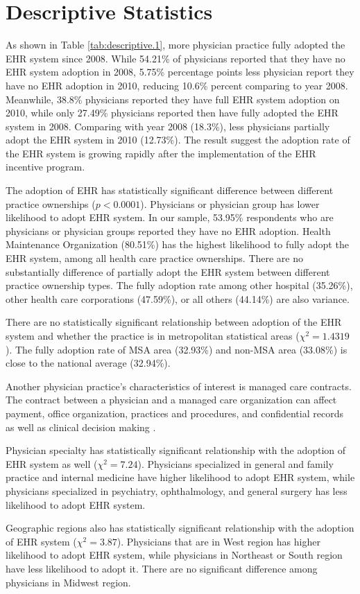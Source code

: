 \section{Descriptive Statistics}

As shown in Table \ref{tab:descriptive.1}, more physician practice fully adopted the EHR system since 2008. While 54.21\% of physicians reported that they have no EHR system adoption in 2008, 5.75\% percentage points less physician report they have no EHR adoption in 2010, reducing 10.6\% percent comparing to year 2008. Meanwhile, 38.8\% physicians reported they have full EHR system adoption on 2010, while only 27.49\% physicians reported then have fully adopted the EHR system in 2008. Comparing with year 2008 (18.3\%), less physicians partially adopt the EHR system in 2010 (12.73\%). The result suggest the adoption rate of the EHR system is growing rapidly after the implementation of the EHR incentive program.

The adoption of EHR has statistically significant difference between different practice ownerships ($p<0.0001$). Physicians or physician group has lower likelihood to adopt EHR system. In our sample, 53.95\% respondents who are physicians or physician groups reported they have no EHR adoption. Health Maintenance Organization (80.51\%) has the highest likelihood to fully adopt the EHR system, among all health care practice ownerships. There are no substantially difference of partially adopt the EHR system between different practice ownership types. The fully adoption rate among other hospital (35.26\%), other health care corporations (47.59\%), or all others (44.14\%) are also variance. 

There are no statistically significant relationship between adoption of the EHR system and whether the practice is in metropolitan statistical areas ($\chi^2=1.4319$). The fully adoption rate of MSA area (32.93\%) and non-MSA area (33.08\%) is close to the national average (32.94\%).

Another physician practice's characteristics of interest is managed care contracts. The contract between a physician and a managed care organization can affect payment, office organization, practices and procedures, and confidential records as well as clinical decision making \citep{mcc2008}.

Physician specialty has statistically significant relationship with the adoption of EHR system as well ($\chi^2=7.24$). Physicians specialized in general and family practice and internal medicine have higher likelihood to adopt EHR system, while physicians specialized in psychiatry, ophthalmology, and general surgery has less likelihood to adopt EHR system.

Geographic regions also has statistically significant relationship with the adoption of EHR system ($\chi^2=3.87$). Physicians that are in West region has higher likelihood to adopt EHR system, while physicians in Northeast or South region have less likelihood to adopt it. There are no significant difference among physicians in Midwest region.
